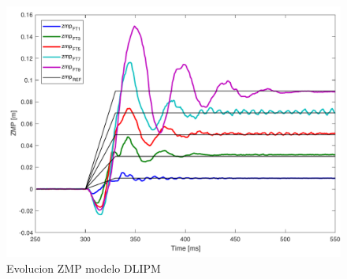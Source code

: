 \begin{figure}[H]
\centering
\includegraphics[scale=0.4]{imagenes/apartado_5/5.1/figura4.pdf}
\caption{Evolucion ZMP modelo DLIPM}
\label{figura55}
\end{figure}



\afterpage{\null\newpage}
\newpage
